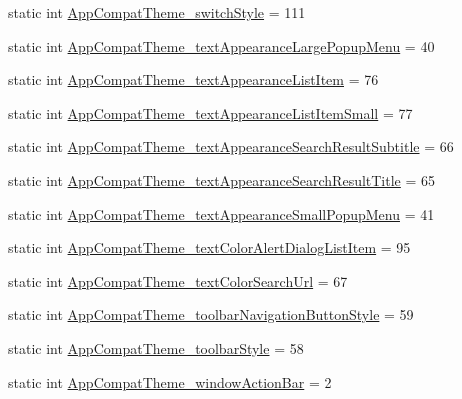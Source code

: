\begin{DoxyCompactItemize}
\item 
static int \hyperlink{classandroid_1_1support_1_1v7_1_1mediarouter_1_1R_1_1styleable_a45f08971148574331038a7defe008f80}{App\+Compat\+Theme\+\_\+switch\+Style} = 111
\item 
static int \hyperlink{classandroid_1_1support_1_1v7_1_1mediarouter_1_1R_1_1styleable_acfb438324ed2a40724401765634c986a}{App\+Compat\+Theme\+\_\+text\+Appearance\+Large\+Popup\+Menu} = 40
\item 
static int \hyperlink{classandroid_1_1support_1_1v7_1_1mediarouter_1_1R_1_1styleable_ae585f2ef6f2ff59cc4f7be52f5ce8f26}{App\+Compat\+Theme\+\_\+text\+Appearance\+List\+Item} = 76
\item 
static int \hyperlink{classandroid_1_1support_1_1v7_1_1mediarouter_1_1R_1_1styleable_abfe06fe93e65f2145a7481cd483217d0}{App\+Compat\+Theme\+\_\+text\+Appearance\+List\+Item\+Small} = 77
\item 
static int \hyperlink{classandroid_1_1support_1_1v7_1_1mediarouter_1_1R_1_1styleable_a505319de1733441b256077401041e226}{App\+Compat\+Theme\+\_\+text\+Appearance\+Search\+Result\+Subtitle} = 66
\item 
static int \hyperlink{classandroid_1_1support_1_1v7_1_1mediarouter_1_1R_1_1styleable_a145215c955a16a489e091f3192f05b55}{App\+Compat\+Theme\+\_\+text\+Appearance\+Search\+Result\+Title} = 65
\item 
static int \hyperlink{classandroid_1_1support_1_1v7_1_1mediarouter_1_1R_1_1styleable_aa0894f67d2b6095af2c79e757016f8ef}{App\+Compat\+Theme\+\_\+text\+Appearance\+Small\+Popup\+Menu} = 41
\item 
static int \hyperlink{classandroid_1_1support_1_1v7_1_1mediarouter_1_1R_1_1styleable_a02d892ae076bbe1feac3d55796e9bca8}{App\+Compat\+Theme\+\_\+text\+Color\+Alert\+Dialog\+List\+Item} = 95
\item 
static int \hyperlink{classandroid_1_1support_1_1v7_1_1mediarouter_1_1R_1_1styleable_a836d3802c62c78eac8fe21e652c6263b}{App\+Compat\+Theme\+\_\+text\+Color\+Search\+Url} = 67
\item 
static int \hyperlink{classandroid_1_1support_1_1v7_1_1mediarouter_1_1R_1_1styleable_a354b2153b08d409c7335a25b06bf98e2}{App\+Compat\+Theme\+\_\+toolbar\+Navigation\+Button\+Style} = 59
\item 
static int \hyperlink{classandroid_1_1support_1_1v7_1_1mediarouter_1_1R_1_1styleable_ad3fea9f4d259e9e79e8d8f944d3f692b}{App\+Compat\+Theme\+\_\+toolbar\+Style} = 58
\item 
static int \hyperlink{classandroid_1_1support_1_1v7_1_1mediarouter_1_1R_1_1styleable_ad5254bfaca20d46ec980af0056e2a282}{App\+Compat\+Theme\+\_\+window\+Action\+Bar} = 2

\end{DoxyCompactItemize}
